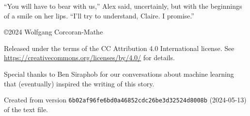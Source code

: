 \documentclass[10pt,b5paper]{article}
\begin{document}
``You will have to bear with us,'' Alex said, uncertainly, but with
the beginnings of a smile on her lips.  ``I'll try to understand,
Claire. I promise.''

\vfill
\begin{flushleft}
\setlength{\parskip}{\baselineskip}
\copyright 2024 Wolfgang Corcoran-Mathe

Released under the terms of the CC Attribution 4.0 International
license. See
\url{https://creativecommons.org/licenses/by/4.0/} for details.

Special thanks to Ben Siraphob for our conversations about machine
learning that (eventually) inspired the writing of this story.

Created from version
\texttt{6b02af96fe6bd0a46852cdc26be3d32524d8008b} (2024-05-13)
of the text file.
\end{flushleft}
\end{document}
